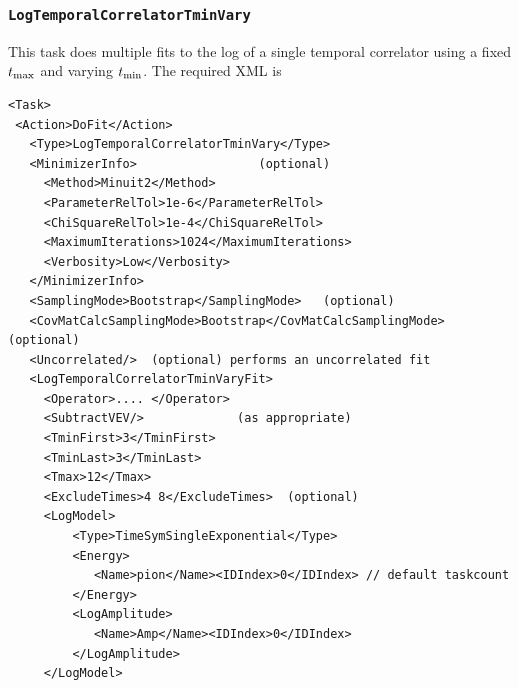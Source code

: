 \documentclass[12pt]{article}
\newcommand{\vb}{\texttt}
\begin{document}
\subsubsection{\vb{LogTemporalCorrelatorTminVary}}

This task does multiple fits to the log of a single temporal correlator using a fixed 
$t_{\rm max}$ and varying $t_{\rm min}$.  The required XML is
\begin{verbatim}
<Task>                                                                   
 <Action>DoFit</Action>                                                  
   <Type>LogTemporalCorrelatorTminVary</Type>                            
   <MinimizerInfo>                 (optional)                            
     <Method>Minuit2</Method>                                            
     <ParameterRelTol>1e-6</ParameterRelTol>                             
     <ChiSquareRelTol>1e-4</ChiSquareRelTol>                             
     <MaximumIterations>1024</MaximumIterations>                         
     <Verbosity>Low</Verbosity>                                          
   </MinimizerInfo>                                                      
   <SamplingMode>Bootstrap</SamplingMode>   (optional)                   
   <CovMatCalcSamplingMode>Bootstrap</CovMatCalcSamplingMode> (optional) 
   <Uncorrelated/>  (optional) performs an uncorrelated fit              
   <LogTemporalCorrelatorTminVaryFit>                                    
     <Operator>.... </Operator>                                          
     <SubtractVEV/>             (as appropriate)                         
     <TminFirst>3</TminFirst>                                            
     <TminLast>3</TminLast>                                              
     <Tmax>12</Tmax>                                                     
     <ExcludeTimes>4 8</ExcludeTimes>  (optional)                        
     <LogModel>                                                          
         <Type>TimeSymSingleExponential</Type>                           
         <Energy>                                                        
            <Name>pion</Name><IDIndex>0</IDIndex> // default taskcount   
         </Energy>                                                       
         <LogAmplitude>                                                  
            <Name>Amp</Name><IDIndex>0</IDIndex>                         
         </LogAmplitude>                                                 
     </LogModel>                                                         

\end{verbatim}
\end{document}
